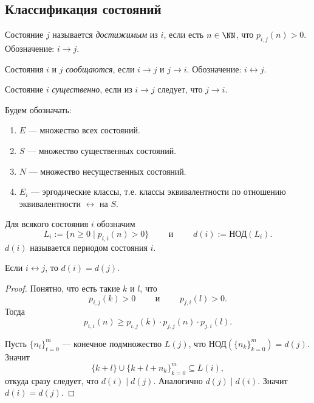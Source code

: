 \documentclass[12pt,a4paper]{article}
\begin{document}
    \subsection{Классификация состояний}

    \begin{definition}
        Состояние $j$ называется \emph{достижимым} из $i$, если есть $n \in \NN$, что $p_{i,j}(n) > 0$. Обозначение: $i \to j$.

        Состояния $i$ и $j$ \emph{сообщаются}, если $i \to j$ и $j \to i$. Обозначение: $i \leftrightarrow j$.

        Состояние $i$ \emph{существенно}, если из $i \to j$ следует, что $j \to i$.
    \end{definition}

    \begin{definition}
        Будем обозначать:
        \begin{enumerate}
            \item $E$ --- множество всех состояний.
            \item $S$ --- множество существенных состояний.
            \item $N$ --- множество несущественных состояний.
            \item $E_i$ --- эргодические классы, т.е. классы эквивалентности по отношению эквивалентности $\leftrightarrow$ на $S$.
        \end{enumerate}
    \end{definition}

    \begin{definition}
        Для всякого состояния $i$ обозначим
        \[L_i := \{n \geqslant 0 \mid p_{i,i}(n) > 0\} \qquad \text{ и } \qquad d(i) := \text{НОД}(L_i).\]
        $d(i)$ называется периодом состояния $i$.
    \end{definition}

    \begin{lemma}
        Если $i \leftrightarrow j$, то $d(i) = d(j)$.
    \end{lemma}

    \begin{proof}
        Понятно, что есть такие $k$ и $l$, что
        \[p_{i, j}(k) > 0 \qquad \text{ и } \qquad p_{j, i}(l) > 0.\]
        Тогда
        \[p_{i, i}(n) \geqslant p_{i, j}(k) \cdot p_{j, j}(n) \cdot p_{j, i}(l).\]
        
        Пусть $\{n_t\}_{t=0}^m$ --- конечное подмножество $L(j)$, что $\text{НОД}(\{n_k\}_{k=0}^m) = d(j)$. Значит
        \[\{k + l\} \cup \{k + l + n_k\}_{k=0}^m \subseteq L(i),\]
        откуда сразу следует, что $d(i) \mid d(j)$. Аналогично $d(j) \mid d(i)$. Значит $d(i) = d(j)$. 
    \end{proof}
\end{document}
